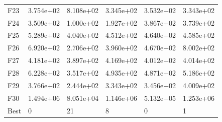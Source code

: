 \begin{tabular}{llllll}
F23  &  3.754e+02 &  8.108e+02 &  3.345e+02 &  3.532e+02 &  3.343e+02 \\
F24  &  3.509e+02 &  1.000e+02 &  1.927e+02 &  3.867e+02 &  3.739e+02 \\
F25  &  5.289e+02 &  4.040e+02 &  4.512e+02 &  4.640e+02 &  4.585e+02 \\
F26  &  6.920e+02 &  2.706e+02 &  3.960e+02 &  4.670e+02 &  8.002e+02 \\
F27  &  4.181e+02 &  3.897e+02 &  4.169e+02 &  4.012e+02 &  4.014e+02 \\
F28  &  6.228e+02 &  3.517e+02 &  4.935e+02 &  4.871e+02 &  5.186e+02 \\
F29  &  3.766e+02 &  2.444e+02 &  3.343e+02 &  3.456e+02 &  4.009e+02 \\
F30  &  1.494e+06 &  8.051e+04 &  1.146e+06 &  5.132e+05 &  1.253e+06 \\
Best &          0 &         21 &          8 &          0 &          1 \\
\bottomrule
\end{tabular}
